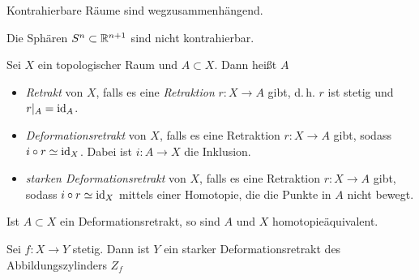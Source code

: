 \documentclass{cheat-sheet}
\begin{document}
\begin{kor}
  Kontrahierbare Räume sind wegzusammenhängend.
\end{kor}

\begin{prop}
  Die Sphären $S^n \subset \mathbb{R}^{n+1}$ sind nicht kontrahierbar.
\end{prop}

\begin{defn}
  Sei $X$ ein topologischer Raum und $A \subset X$. Dann heißt $A$
  \begin{itemize}
    \item \emph{Retrakt} von $X$, falls es eine \emph{Retraktion} $r : X \to A$ gibt, d.\,h. $r$ ist stetig und $r|_A = \mathrm{id}_A$.
    \item \emph{Deformationsretrakt} von $X$, falls es eine Retraktion $r : X \to A$ gibt, sodass $i \circ r \simeq \mathrm{id}_X$. Dabei ist $i : A \to X$ die Inklusion.
    \item \emph{starken Deformationsretrakt} von $X$, falls es eine Retraktion $r : X \to A$ gibt, sodass $i \circ r \simeq \mathrm{id}_X$ mittels einer Homotopie, die die Punkte in $A$ nicht bewegt.
  \end{itemize}
\end{defn}

\begin{bem}
  Ist $A \subset X$ ein Deformationsretrakt, so sind $A$ und $X$ homotopieäquivalent.
\end{bem}

\begin{bsp}
  Sei $f : X \to Y$ stetig. Dann ist $Y$ ein starker Deformationsretrakt des Abbildungszylinders $Z_f$
\end{bsp}
\end{document}
